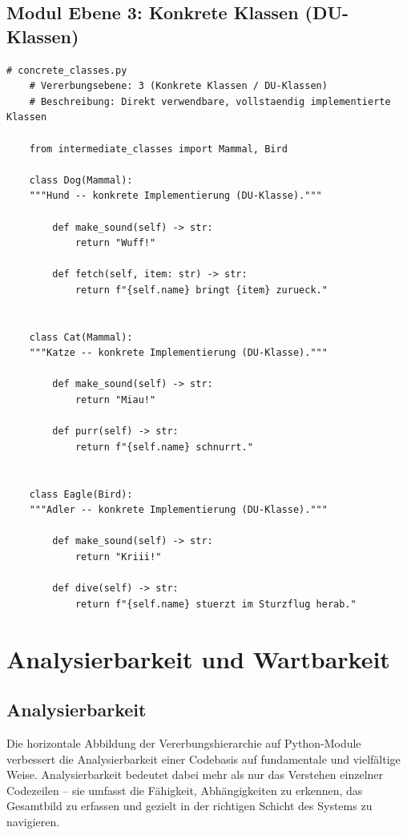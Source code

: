 ﻿\documentclass[a4paper,12pt]{article}
\begin{document}
\subsection{Modul Ebene 3: Konkrete Klassen (DU-Klassen)}

\begin{lstlisting}[caption={concrete\_classes.py -- Ebene 3 der Vererbungshierarchie (DU-Klassen)},
	label={lst:concrete}]
	# concrete_classes.py
	# Vererbungsebene: 3 (Konkrete Klassen / DU-Klassen)
	# Beschreibung: Direkt verwendbare, vollstaendig implementierte Klassen
	
	from intermediate_classes import Mammal, Bird
	
	class Dog(Mammal):
	"""Hund -- konkrete Implementierung (DU-Klasse)."""
	
		def make_sound(self) -> str:
			return "Wuff!"
	
		def fetch(self, item: str) -> str:
			return f"{self.name} bringt {item} zurueck."
	
	
	class Cat(Mammal):
	"""Katze -- konkrete Implementierung (DU-Klasse)."""
	
		def make_sound(self) -> str:
			return "Miau!"
	
		def purr(self) -> str:
			return f"{self.name} schnurrt."
	
	
	class Eagle(Bird):
	"""Adler -- konkrete Implementierung (DU-Klasse)."""
	
		def make_sound(self) -> str:
			return "Kriii!"
	
		def dive(self) -> str:
			return f"{self.name} stuerzt im Sturzflug herab."
\end{lstlisting}

\section{Analysierbarkeit und Wartbarkeit}

\subsection{Analysierbarkeit}

Die horizontale Abbildung der Vererbungshierarchie auf Python-Module verbessert
die Analysierbarkeit einer Codebasis auf fundamentale und vielfältige Weise.
Analysierbarkeit bedeutet dabei mehr als nur das Verstehen einzelner Codezeilen --
sie umfasst die Fähigkeit, Abhängigkeiten zu erkennen, das Gesamtbild zu erfassen
und gezielt in der richtigen Schicht des Systems zu navigieren.
\end{document}
